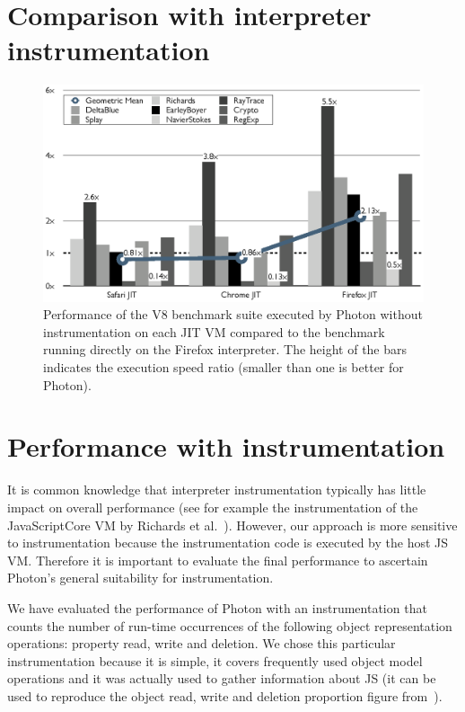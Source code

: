 \section{Comparison with interpreter instrumentation}

\begin{figure}[htbp]
\begin{center}
\includegraphics[width=.85\textwidth]{figures/ComparisonToInterpreter}
\caption[Performance of the V8 benchmark suite executed by Photon without instrumentation]{Performance of the V8 benchmark suite executed by Photon without instrumentation
on each JIT VM compared to the benchmark running directly on the Firefox interpreter.  The height of the bars
indicates the execution speed ratio (smaller than one is better for Photon).}
\label{fig:perf-no-instrumentation-photon-vs-interpreter}
\end{center}
\end{figure}


\section{Performance with instrumentation}


It is common knowledge that interpreter instrumentation typically has
little impact on overall performance (see for example the
instrumentation of the JavaScriptCore VM by Richards et
al.~\cite{behavior_js}).  However, our approach is more sensitive to
instrumentation because the instrumentation code is executed by the
host JS VM.  Therefore it is important to evaluate the final
performance to ascertain Photon's general suitability for
instrumentation.

We have evaluated the performance of Photon with an instrumentation
that counts the number of run-time occurrences of the following
object representation operations: property read, write and
deletion. We chose this particular instrumentation because it is
simple, it covers frequently used object model operations and it was
actually used to gather information about JS (it can be used
to reproduce the object read, write and deletion proportion figure
from~\cite{behavior_js}).

